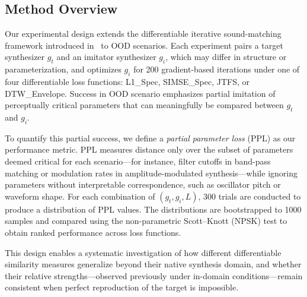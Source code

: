 \documentclass[runningheads]{llncs}
\providecommand{\gls}[1]{#1}
\begin{document}
\subsection{Method Overview}
\label{sec:method_overview}

Our experimental design extends the differentiable iterative sound-matching framework introduced in~\cite{salimi2025evaluating} to OOD scenarios.
Each experiment pairs a target synthesizer $g_t$ and an imitator synthesizer $g_i$, which may differ in structure or parameterization, and optimizes $g_i$ for 200 gradient-based iterations under one of four differentiable loss functions: L1\_Spec, SIMSE\_Spec, JTFS, or DTW\_Envelope. Success in OOD scenario emphasizes partial imitation of perceptually critical parameters that can meaningfully be compared between $g_t$ and $g_i$.

To quantify this partial success, we define a \textit{partial parameter loss} (PPL) as our performance metric.  
PPL measures distance only over the subset of parameters deemed critical for each scenario—for instance, filter cutoffs in band-pass matching or modulation rates in amplitude-modulated synthesis—while ignoring parameters without interpretable correspondence, such as oscillator pitch or waveform shape.  
For each combination of $(g_t, g_i, L)$, 300 trials are conducted to produce a distribution of PPL values.  
The distributions are bootstrapped to 1000 samples and compared using the non-parametric Scott–Knott (\gls{NPSK}) test to obtain ranked performance across loss functions.  

This design enables a systematic investigation of how different differentiable similarity measures generalize beyond their native synthesis domain, and whether their relative strengths—observed previously under in-domain conditions—remain consistent when perfect reproduction of the target is impossible.
\end{document}
